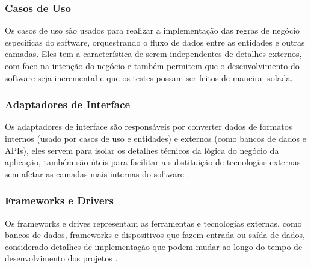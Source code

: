         \subsubsection{Casos de Uso}
            \par Os casos de uso são usados para realizar a implementação das regras de negócio específicas do software, orquestrando o fluxo de dados entre as entidades e outras camadas. Eles tem a característica de serem independentes de detalhes externos, com foco na intenção do negócio e também permitem que o desenvolvimento do software seja incremental e que os testes possam ser feitos de maneira isolada. \cite{artigo:ferreira:2022, livro:martin:cleanarch}
            
        \subsubsection{Adaptadores de Interface}

            \par Os adaptadores de interface são responsáveis por converter dados de formatos internos (usado por casos de uso e entidades) e externos (como bancos de dados e APIs), eles servem para isolar os detalhes técnicos da lógica do negócio da aplicação, também são úteis para facilitar a substituição de tecnologias externas sem afetar as camadas mais internas do software \cite{livro:martin:cleanarch}. 
            
        \subsubsection{Frameworks e Drivers}

            \par Os frameworks e drives representam as ferramentas e tecnologias externas, como bancos de dados, frameworks e dispositivos que fazem entrada ou saída de dados, considerado detalhes de implementação que podem mudar ao longo do tempo de desenvolvimento dos projetos \cite{livro:martin:cleanarch}.